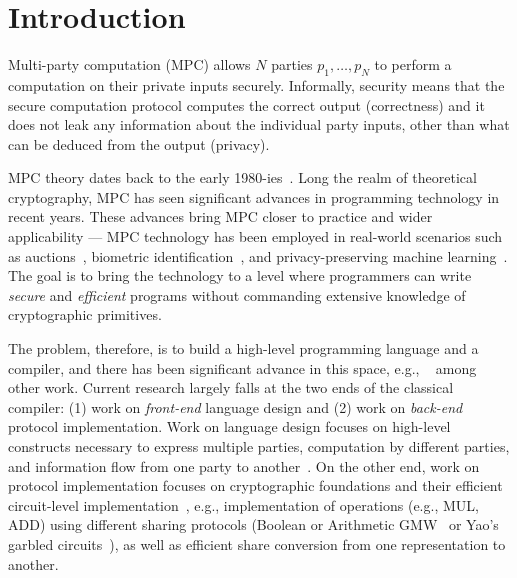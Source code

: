\documentclass[sigconf, screen, natbib=false, dvipsnames, table]{acmart}
\theoremstyle{definition}
\begin{document}
\section{Introduction}
\label{sec:introduction}

Multi-party computation (MPC) allows $N$ parties $p_1,\dots, p_N$ to perform a computation on their private inputs securely. Informally, security means that the secure computation protocol computes the correct output (correctness) and it does not leak any information about the individual party inputs, other than what can be deduced from the output (privacy).


MPC theory dates back to the early 1980-ies~\cite{FOCS:Yao82b,STOC:GolMicWig87,STOC:BenGolWig88,STOC:ChaCreDam88}. 
Long the realm of theoretical cryptography, MPC has seen significant advances in programming technology in recent years. 
These advances bring MPC closer to practice and wider applicability --- 
MPC technology has been employed in real-world scenarios such as auctions~\cite{FC:BCDGJK09}, biometric identification~\cite{ESORICS:BlaGas11}, 
and privacy-preserving machine learning~\cite{SP:MohZha17,CCS:MohRin18}. 
The goal is to bring the technology to a level where programmers can write \emph{secure} and \emph{efficient} programs without 
commanding extensive knowledge of cryptographic primitives. 

The problem, therefore, is to build a high-level programming language and a compiler, and there has been significant advance in 
this space, e.g., ~\cite{CCS:BenNisPin08,ESORICS:BogLauWil08,CCS:ZhaSteBla13,Hastings:2019,Keller:2020,Acay:2021,Braun:2022} among other work. 
Current research largely falls at the two ends 
of the classical compiler: (1) work on \emph{front-end} language design and (2) work on \emph{back-end} protocol implementation. Work on language design 
focuses on high-level constructs necessary to express multiple parties, computation by different parties, and information flow from one party 
to another~\cite{SP:RasHamHic14, Acay:2021}. On the other end, work on protocol implementation focuses on cryptographic foundations and their efficient circuit-level
implementation~\cite{NDSS:DemSchZoh15, CCS:ABFKLO18, Braun:2022}, e.g., implementation of operations (e.g., MUL, ADD) using different sharing protocols 
(Boolean or Arithmetic GMW~\cite{STOC:GolMicWig87} or Yao's garbled circuits~\cite{FOCS:Yao82b}), as well as efficient share conversion from one representation 
to another.
\end{document}
